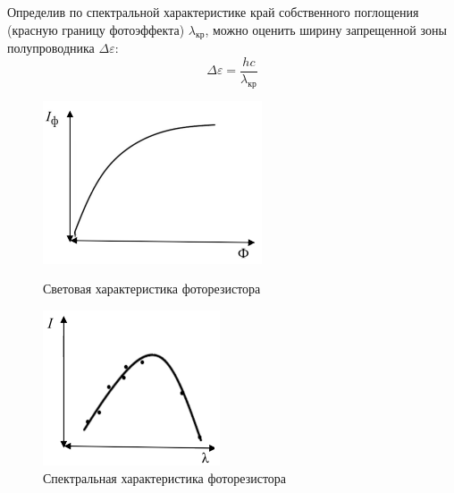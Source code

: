 Определив по спектральной характеристике край собственного поглощения (красную границу фотоэффекта) $\lambda_\text{кр}$, можно оценить ширину запрещенной зоны полупроводника $\Delta\varepsilon$:
$$ \Delta\varepsilon = \frac{hc}{\lambda_\text{кр}} $$

\begin{figure}[H]
    \centering
    \begin{minipage}{0.48\linewidth}
        \centering
        \def\thefigure{7.7}
        \protect{}
        \includegraphics[width=0.9\linewidth]{figs/7-7.png}
        \caption{Световая характеристика фоторезистора}
        \label{fig:light_char}
    \end{minipage}\hfill
    \begin{minipage}{0.48\linewidth}
        \centering
        \def\thefigure{7.8}
        \protect{}
        \includegraphics[width=0.9\linewidth]{figs/7-8.png}
        \caption{Спектральная характеристика фоторезистора}
        \label{fig:spectral_char}
    \end{minipage}
\end{figure}


